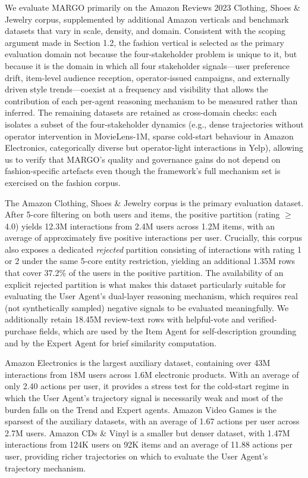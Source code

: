 \documentclass[master,english,final]{postech-ucs}
\begin{document}
We evaluate MARGO primarily on the Amazon Reviews 2023 Clothing, Shoes \& Jewelry corpus, supplemented by additional Amazon verticals and benchmark datasets that vary in scale, density, and domain.
Consistent with the scoping argument made in Section 1.2, the fashion vertical is selected as the primary evaluation domain not because the four-stakeholder problem is unique to it, but because it is the domain in which all four stakeholder signals---user preference drift, item-level audience reception, operator-issued campaigns, and externally driven style trends---coexist at a frequency and visibility that allows the contribution of each per-agent reasoning mechanism to be measured rather than inferred.
The remaining datasets are retained as cross-domain checks: each isolates a subset of the four-stakeholder dynamics (e.g., dense trajectories without operator intervention in MovieLens-1M, sparse cold-start behaviour in Amazon Electronics, categorically diverse but operator-light interactions in Yelp), allowing us to verify that MARGO's quality and governance gains do not depend on fashion-specific artefacts even though the framework's full mechanism set is exercised on the fashion corpus.

The Amazon Clothing, Shoes \& Jewelry corpus is the primary evaluation dataset.
After 5-core filtering on both users and items, the positive partition (rating $\geq$ 4.0) yields 12.3M interactions from 2.4M users across 1.2M items, with an average of approximately five positive interactions per user.
Crucially, this corpus also exposes a dedicated \emph{rejected} partition consisting of interactions with rating 1 or 2 under the same 5-core entity restriction, yielding an additional 1.35M rows that cover 37.2\% of the users in the positive partition.
The availability of an explicit rejected partition is what makes this dataset particularly suitable for evaluating the User Agent's dual-layer reasoning mechanism, which requires real (not synthetically sampled) negative signals to be evaluated meaningfully.
We additionally retain 18.45M review-text rows with helpful-vote and verified-purchase fields, which are used by the Item Agent for self-description grounding and by the Expert Agent for brief similarity computation.

Amazon Electronics is the largest auxiliary dataset, containing over 43M interactions from 18M users across 1.6M electronic products.
With an average of only 2.40 actions per user, it provides a stress test for the cold-start regime in which the User Agent's trajectory signal is necessarily weak and most of the burden falls on the Trend and Expert agents.
Amazon Video Games is the sparsest of the auxiliary datasets, with an average of 1.67 actions per user across 2.7M users.
Amazon CDs \& Vinyl is a smaller but denser dataset, with 1.47M interactions from 124K users on 92K items and an average of 11.88 actions per user, providing richer trajectories on which to evaluate the User Agent's trajectory mechanism.
\end{document}
